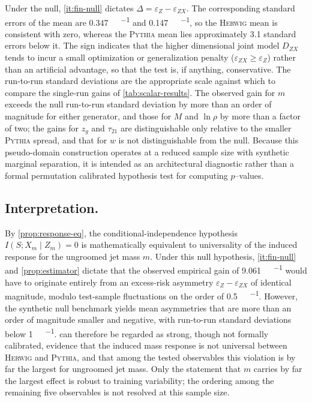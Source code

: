 \documentclass[12pt]{article}
\newcommand{\1}{\mathbbm{1}}
\renewcommand{\[}{\begin{equation}}
\renewcommand{\]}{\end{equation}}
\begin{document}
    Under the null, \cref{it:fin-null} dictates \(\Delta = \varepsilon_Z - \varepsilon_{ZX}\).
    The corresponding standard errors of the mean are \qty{0.347}{\milli\nat\per\event} and \qty{0.147}{\milli\nat\per\event}, so the \textsc{Herwig} mean is consistent with zero, whereas the \textsc{Pythia} mean lies approximately \num{3.1} standard errors below it.
    The sign indicates that the higher dimensional joint model \(D_{ZX}\) tends to incur a small optimization or generalization penalty (\(\varepsilon_{ZX} \ge \varepsilon_Z\)) rather than an artificial advantage, so that the test is, if anything, conservative.
    The run-to-run standard deviations are the appropriate scale against which to compare the single-run gains of \cref{tab:scalar-results}.
    The observed gain for \(m\) exceeds the null run-to-run standard deviation by more than an order of magnitude for either generator, and those for \(M\) and \(\ln\rho\) by more than a factor of two; the gains for \(z_g\) and \(\tau_{21}\) are distinguishable only relative to the smaller \textsc{Pythia} spread, and that for \(w\) is not distinguishable from the null.
    Because this pseudo-domain construction operates at a reduced sample size with synthetic marginal separation, it is intended as an architectural diagnostic rather than a formal permutation calibrated hypothesis test for computing \(p\)--values.

    \subsection{Interpretation.}
    \label{sec:interpretation}

    By \cref{prop:response-eq}, the conditional-independence hypothesis \(I(S; X_m \mid Z_m) = 0\) is mathematically equivalent to universality of the induced response for the ungroomed jet mass \(m\).
    Under this null hypothesis, \cref{it:fin-null} and \cref{prop:estimator} dictate that the observed empirical gain of \qty{9.061}{\milli\nat\per\event} would have to originate entirely from an excess-risk asymmetry \(\varepsilon_Z - \varepsilon_{ZX}\) of identical magnitude, modulo test-sample fluctuations on the order of \qty{0.5}{\milli\nat\per\event}.
    However, the synthetic null benchmark yields mean asymmetries that are more than an order of magnitude smaller and negative, with run-to-run standard deviations below \qty{1}{\milli\nat\per\event}.
     can therefore be regarded as strong, though not formally calibrated, evidence that the induced mass response is not universal between \textsc{Herwig} and \textsc{Pythia}, and that among the tested observables this violation is by far the largest for ungroomed jet mass.
    Only the statement that \(m\) carries by far the largest effect is robust to training variability; the ordering among the remaining five observables is not resolved at this sample size.
\end{document}
